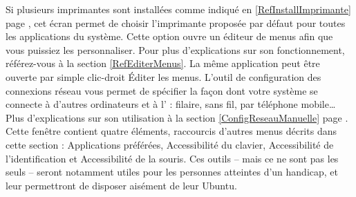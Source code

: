 Si plusieurs imprimantes sont installées comme indiqué en \ref{RefInstallImprimante} page \pageref{RefInstallImprimante}, cet écran permet de choisir l'imprimante proposée par défaut pour toutes les applications du système.
Cette option ouvre un éditeur de menus afin que vous puissiez les personnaliser. Pour plus d'explications sur son fonctionnement, référez-vous à la section \ref{RefEditerMenus}. La même application peut être ouverte par simple clic-droit \FlecheDroite Éditer les menus.
L'outil de configuration des connexions réseau vous permet de spécifier la façon dont votre système se connecte à d'autres ordinateurs et à l' : filaire, sans fil, par téléphone mobile\ldots{} Plus d'explications sur son utilisation à la section \ref{ConfigReseauManuelle} page \pageref{ConfigReseauManuelle}.
Cette fenêtre contient quatre éléments, raccourcis d'autres menus décrits dans cette section : Applications préférées, Accessibilité du clavier, Accessibilité de l'identification et Accessibilité de la souris. Ces outils -- mais ce ne sont pas les seuls -- seront notamment utiles pour les personnes atteintes d'un handicap, et leur permettront de disposer aisément de leur Ubuntu.
